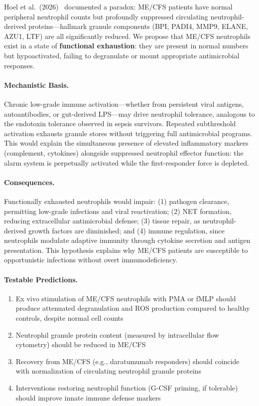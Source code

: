 \begin{hypothesis}
\label{hyp:neutrophil-exhaustion}

Hoel et al.\ (2026)~\cite{Hoel2026proteome} documented a paradox: ME/CFS patients have normal peripheral neutrophil counts but profoundly suppressed circulating neutrophil-derived proteins---hallmark granule components (BPI, PADI4, MMP9, ELANE, AZU1, LTF) are all significantly reduced. We propose that ME/CFS neutrophils exist in a state of \textbf{functional exhaustion}: they are present in normal numbers but hypoactivated, failing to degranulate or mount appropriate antimicrobial responses.

\paragraph{Mechanistic Basis.}
Chronic low-grade immune activation---whether from persistent viral antigens, autoantibodies, or gut-derived LPS---may drive neutrophil tolerance, analogous to the endotoxin tolerance observed in sepsis survivors. Repeated subthreshold activation exhausts granule stores without triggering full antimicrobial programs. This would explain the simultaneous presence of elevated inflammatory markers (complement, cytokines) alongside suppressed neutrophil effector function: the alarm system is perpetually activated while the first-responder force is depleted.

\paragraph{Consequences.}
Functionally exhausted neutrophils would impair: (1) pathogen clearance, permitting low-grade infections and viral reactivation; (2) NET formation, reducing extracellular antimicrobial defense; (3) tissue repair, as neutrophil-derived growth factors are diminished; and (4) immune regulation, since neutrophils modulate adaptive immunity through cytokine secretion and antigen presentation. This hypothesis explains why ME/CFS patients are susceptible to opportunistic infections without overt immunodeficiency.

\paragraph{Testable Predictions.}
\begin{enumerate}
    \item Ex vivo stimulation of ME/CFS neutrophils with PMA or fMLP should produce attenuated degranulation and ROS production compared to healthy controls, despite normal cell counts
    \item Neutrophil granule protein content (measured by intracellular flow cytometry) should be reduced in ME/CFS
    \item Recovery from ME/CFS (e.g., daratumumab responders) should coincide with normalization of circulating neutrophil granule proteins
    \item Interventions restoring neutrophil function (G-CSF priming, if tolerable) should improve innate immune defense markers
\end{enumerate}


\end{hypothesis}
